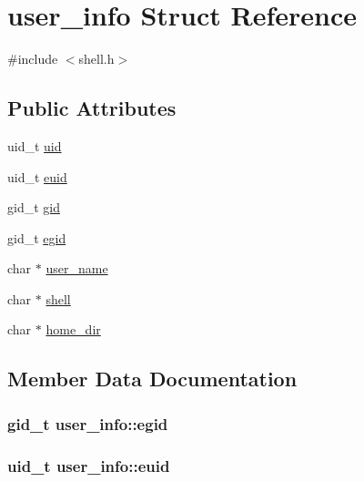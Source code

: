\hypertarget{structuser__info}{}\section{user\+\_\+info Struct Reference}
\label{structuser__info}


{\ttfamily \#include $<$shell.\+h$>$}

\subsection*{Public Attributes}
\begin{DoxyCompactItemize}
\item 
uid\+\_\+t \hyperlink{structuser__info_a336097610439e04eccd63acef69443de}{uid}
\item 
uid\+\_\+t \hyperlink{structuser__info_a2b1ad40af96833f849390bc775e9dd16}{euid}
\item 
gid\+\_\+t \hyperlink{structuser__info_a99413c55942db77ae3cf544bb82f6af7}{gid}
\item 
gid\+\_\+t \hyperlink{structuser__info_a6c019b799f5b6235d8a34a40ea5138d1}{egid}
\item 
char $\ast$ \hyperlink{structuser__info_abecea7d4c564b4b56c985c3e450f9e62}{user\+\_\+name}
\item 
char $\ast$ \hyperlink{structuser__info_a35b196ef8d0bbd4329645dac6d3d48be}{shell}
\item 
char $\ast$ \hyperlink{structuser__info_a862cf8cbf50b91c8b52fdf0fb00c461d}{home\+\_\+dir}
\end{DoxyCompactItemize}


\subsection{Member Data Documentation}
\subsubsection[{\texorpdfstring{egid}{egid}}]{\setlength{\rightskip}{0pt plus 5cm}gid\+\_\+t user\+\_\+info\+::egid}\hypertarget{structuser__info_a6c019b799f5b6235d8a34a40ea5138d1}{}\label{structuser__info_a6c019b799f5b6235d8a34a40ea5138d1}
\subsubsection[{\texorpdfstring{euid}{euid}}]{\setlength{\rightskip}{0pt plus 5cm}uid\+\_\+t user\+\_\+info\+::euid}\hypertarget{structuser__info_a2b1ad40af96833f849390bc775e9dd16}{}\label{structuser__info_a2b1ad40af96833f849390bc775e9dd16}
